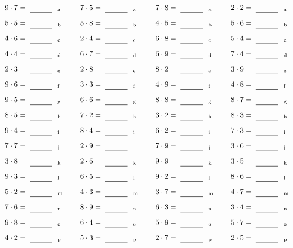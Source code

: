 \documentclass
[
  draft    = true,
  fontsize = 11pt,
  parskip  = half-
]
{scrartcl}
\begin{document}
\par\vfill\par
\begin{align*}
    \pline{9\cdot7}&=\rline{a}
  & \pline{7\cdot5}&=\rline{a}
  & \pline{7\cdot8}&=\rline{a}
  & \pline{2\cdot2}&=\rline{a} \\[1ex]
    \pline{5\cdot5}&=\rline{b}
  & \pline{5\cdot8}&=\rline{b}
  & \pline{4\cdot5}&=\rline{b}
  & \pline{5\cdot6}&=\rline{b} \\[1ex]
    \pline{4\cdot6}&=\rline{c}
  & \pline{2\cdot4}&=\rline{c}
  & \pline{6\cdot8}&=\rline{c}
  & \pline{5\cdot4}&=\rline{c} \\[1ex]
    \pline{4\cdot4}&=\rline{d}
  & \pline{6\cdot7}&=\rline{d}
  & \pline{6\cdot9}&=\rline{d}
  & \pline{7\cdot4}&=\rline{d} \\[1ex]
    \pline{2\cdot3}&=\rline{e}
  & \pline{2\cdot8}&=\rline{e}
  & \pline{8\cdot2}&=\rline{e}
  & \pline{3\cdot9}&=\rline{e} \\[1ex]
    \pline{9\cdot6}&=\rline{f}
  & \pline{3\cdot3}&=\rline{f}
  & \pline{4\cdot9}&=\rline{f}
  & \pline{4\cdot8}&=\rline{f} \\[1ex]
    \pline{9\cdot5}&=\rline{g}
  & \pline{6\cdot6}&=\rline{g}
  & \pline{8\cdot8}&=\rline{g}
  & \pline{8\cdot7}&=\rline{g} \\[1ex]
    \pline{8\cdot5}&=\rline{h}
  & \pline{7\cdot2}&=\rline{h}
  & \pline{3\cdot2}&=\rline{h}
  & \pline{8\cdot3}&=\rline{h} \\[1ex]
    \pline{9\cdot4}&=\rline{i}
  & \pline{8\cdot4}&=\rline{i}
  & \pline{6\cdot2}&=\rline{i}
  & \pline{7\cdot3}&=\rline{i} \\[1ex]
    \pline{7\cdot7}&=\rline{j}
  & \pline{2\cdot9}&=\rline{j}
  & \pline{7\cdot9}&=\rline{j}
  & \pline{3\cdot6}&=\rline{j} \\[1ex]
    \pline{3\cdot8}&=\rline{k}
  & \pline{2\cdot6}&=\rline{k}
  & \pline{9\cdot9}&=\rline{k}
  & \pline{3\cdot5}&=\rline{k} \\[1ex]
    \pline{9\cdot3}&=\rline{l}
  & \pline{6\cdot5}&=\rline{l}
  & \pline{9\cdot2}&=\rline{l}
  & \pline{8\cdot6}&=\rline{l} \\[1ex]
    \pline{5\cdot2}&=\rline{m}
  & \pline{4\cdot3}&=\rline{m}
  & \pline{3\cdot7}&=\rline{m}
  & \pline{4\cdot7}&=\rline{m} \\[1ex]
    \pline{7\cdot6}&=\rline{n}
  & \pline{8\cdot9}&=\rline{n}
  & \pline{6\cdot3}&=\rline{n}
  & \pline{3\cdot4}&=\rline{n} \\[1ex]
    \pline{9\cdot8}&=\rline{o}
  & \pline{6\cdot4}&=\rline{o}
  & \pline{5\cdot9}&=\rline{o}
  & \pline{5\cdot7}&=\rline{o} \\[1ex]
    \pline{4\cdot2}&=\rline{p}
  & \pline{5\cdot3}&=\rline{p}
  & \pline{2\cdot7}&=\rline{p}
  & \pline{2\cdot5}&=\rline{p}
\end{align*}
\end{document}
